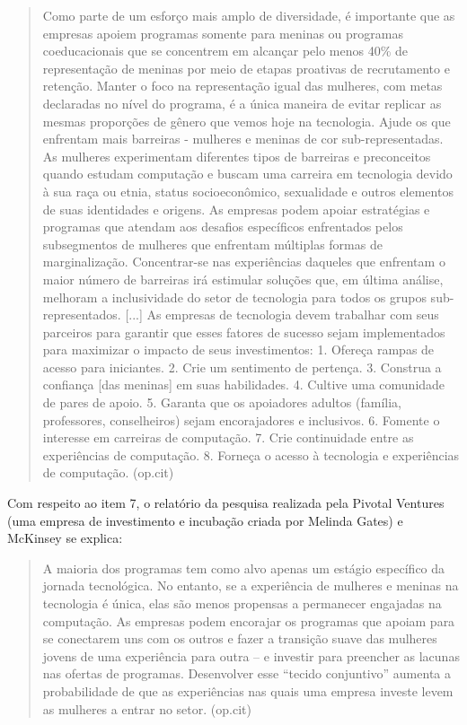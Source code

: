 \begin{quote}
Como parte de um esforço mais amplo de diversidade, é importante que as
empresas apoiem programas somente para meninas ou programas
coeducacionais que se concentrem em alcançar pelo menos 40\% de
representação de meninas por meio de etapas proativas de recrutamento e
retenção. Manter o foco na representação igual das mulheres, com metas
declaradas no nível do programa, é a única maneira de evitar replicar as
mesmas proporções de gênero que vemos hoje na tecnologia. Ajude os que
enfrentam mais barreiras - mulheres e meninas de cor sub-representadas.
As mulheres experimentam diferentes tipos de barreiras e preconceitos
quando estudam computação e buscam uma carreira em tecnologia devido à
sua raça ou etnia, status socioeconômico, sexualidade e outros elementos
de suas identidades e origens. As empresas podem apoiar estratégias e
programas que atendam aos desafios específicos enfrentados pelos
subsegmentos de mulheres que enfrentam múltiplas formas de
marginalização. Concentrar-se nas experiências daqueles que enfrentam o
maior número de barreiras irá estimular soluções que, em última análise,
melhoram a inclusividade do setor de tecnologia para todos os grupos
sub-representados. {[}...{]} As empresas de tecnologia devem trabalhar
com seus parceiros para garantir que esses fatores de sucesso sejam
implementados para maximizar o impacto de seus investimentos: 1. Ofereça
rampas de acesso para iniciantes. 2. Crie um sentimento de pertença. 3.
Construa a confiança {[}das meninas{]} em suas habilidades. 4. Cultive
uma comunidade de pares de apoio. 5. Garanta que os apoiadores adultos
(família, professores, conselheiros) sejam encorajadores e inclusivos.
6. Fomente o interesse em carreiras de computação. 7. Crie continuidade
entre as experiências de computação. 8. Forneça o acesso à tecnologia e
experiências de computação. (op.cit)
\end{quote}

Com respeito ao item 7, o relatório da pesquisa realizada pela Pivotal
Ventures (uma empresa de investimento e incubação criada por Melinda
Gates) e McKinsey se explica:

\begin{quote}
A maioria dos programas tem como alvo apenas um estágio específico da
jornada tecnológica. No entanto, se a experiência de mulheres e meninas
na tecnologia é única, elas são menos propensas a permanecer engajadas
na computação. As empresas podem encorajar os programas que apoiam para
se conectarem uns com os outros e fazer a transição suave das mulheres
jovens de uma experiência para outra -- e investir para preencher as
lacunas nas ofertas de programas. Desenvolver esse ``tecido conjuntivo''
aumenta a probabilidade de que as experiências nas quais uma empresa
investe levem as mulheres a entrar no setor. (op.cit)
\end{quote}

